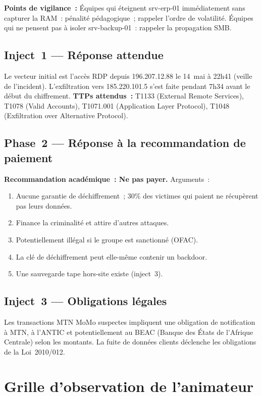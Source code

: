\textbf{Points de vigilance~:} Équipes qui éteignent srv-erp-01 immédiatement
sans capturer la RAM~: pénalité pédagogique~; rappeler l'ordre de volatilité.
Équipes qui ne pensent pas à isoler srv-backup-01~: rappeler la propagation SMB.

\subsection*{Inject~1 — Réponse attendue}

Le vecteur initial est l'accès RDP depuis 196.207.12.88 le 14~mai à 22h41
(veille de l'incident). L'exfiltration vers 185.220.101.5 s'est faite
pendant 7h34 avant le début du chiffrement.
\textbf{TTPs attendus~:} T1133 (External Remote Services),
T1078 (Valid Accounts), T1071.001 (Application Layer Protocol),
T1048 (Exfiltration over Alternative Protocol).

\subsection*{Phase~2 — Réponse à la recommandation de paiement}

\textbf{Recommandation académique~: Ne pas payer.}
Arguments~:
\begin{enumerate}
  \item Aucune garantie de déchiffrement~; 30\% des victimes qui paient
        ne récupèrent pas leurs données.
  \item Finance la criminalité et attire d'autres attaques.
  \item Potentiellement illégal si le groupe est sanctionné (OFAC).
  \item La clé de déchiffrement peut elle-même contenir un backdoor.
  \item Une sauvegarde tape hors-site existe (inject~3).
\end{enumerate}

\subsection*{Inject~3 — Obligations légales}

Les transactions MTN MoMo suspectes impliquent une obligation de
notification à MTN, à l'ANTIC et potentiellement au BEAC
(Banque des États de l'Afrique Centrale) selon les montants.
La fuite de données clients déclenche les obligations de la Loi~2010/012.

\section*{Grille d'observation de l'animateur}

